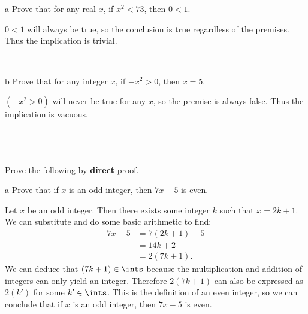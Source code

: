 \documentclass{article}
\begin{document}
\section{}


\begin{problem} a
Prove that for any real $x$, if $x^2 < 73$, then $0 < 1$.
\end{problem}


$0 < 1$ will always be true, so the conclusion is true regardless of the premises. Thus the implication is trivial.

\


\begin{problem} b
Prove that for any integer $x$, if $-x^2 > 0$, then $x = 5$.
\end{problem}


$(-x^2 >0)$ will never be true for any $x$, so the premise is always false. Thus the implication is vacuous.

\
\hline
\section{}

\begin{problem*}
Prove the following by \textbf{direct} proof.
\end{problem*}

\begin{problem} a
Prove that if $x$ is an odd integer, then $7x - 5$ is even.
\end{problem}

Let $x$ be an odd integer. Then there exists some integer $k$ such that $x=2k+1$.
We can substitute and do some basic arithmetic to find:
\begin{align*}
    7x-5 &= 7(2k+1) - 5 \\
    &= 14k+2 \\
    &= 2(7k+1).
\end{align*}
We can deduce that $(7k+1) \in \ints$ because the multiplication and addition of integers can only yield an integer. Therefore $2(7k+1)$ can also be expressed as $2(k')$ for some $k' \in \ints$. This is the definition of an even integer, so we can conclude that if $x$ is an odd integer, then $7x-5$ is even.
\end{document}
